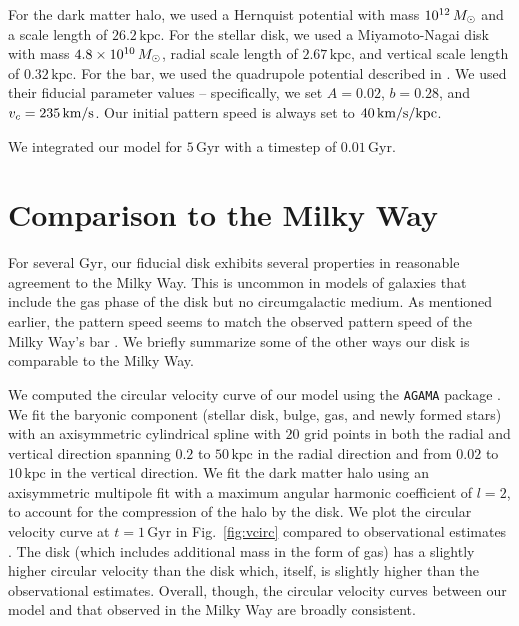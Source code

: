 \begin{appendices}
For the dark matter halo, we used a Hernquist potential
\citep{1990ApJ...356..359H} with mass $10^{12}\,M_{\odot}$ and a scale length of
$26.2\,\textrm{kpc}$. For the stellar disk, we used a Miyamoto-Nagai disk
\citep{1975PASJ...27..533M} with mass $4.8\times10^{10}\,M_{\odot}$, radial scale
length of $2.67\,\textrm{kpc}$, and vertical scale length of
$0.32\,\textrm{kpc}$. For the bar, we used the quadrupole potential described in
\citet{2022MNRAS.513..768C}. We used their fiducial parameter values --
specifically, we set $A=0.02$, $b=0.28$, and $v_c = 235\,\textrm{km}/\textrm{s}$. Our initial
pattern speed is always set to $40\,\textrm{km}/\textrm{s}/\textrm{kpc}$.

We integrated our model for $5\,\textrm{Gyr}$ with a timestep of
$0.01\,\textrm{Gyr}$.

\section{Comparison to the Milky Way}
\label{ch2:app:milkyway}
For several Gyr, our fiducial disk exhibits several properties in reasonable
agreement to the Milky Way. This is uncommon in models of galaxies that include
the gas phase of the disk but no circumgalactic medium. As mentioned earlier,
the pattern speed seems to match the observed pattern speed of the Milky Way's
bar \citep{2019MNRAS.490.4740B}. We briefly summarize some of the other ways our
disk is comparable to the Milky Way.

We computed the circular velocity curve of our model using the \texttt{AGAMA}
package \citep{2019MNRAS.482.1525V}. We fit the baryonic component (stellar
disk, bulge, gas, and newly formed stars) with an axisymmetric cylindrical
spline with $20$ grid points in both the radial and vertical direction spanning
$0.2$ to $50\,\textrm{kpc}$ in the radial direction and from $0.02$ to
$10\,\textrm{kpc}$ in the vertical direction. We fit the dark matter halo using
an axisymmetric multipole fit with a maximum angular harmonic coefficient
of $l=2$, to account for the compression of the halo by the disk. We plot
the circular velocity curve at $t=1\,\textrm{Gyr}$ in Fig.~\ref{fig:vcirc}
compared to observational estimates \citep{2019ApJ...871..120E}. The \SMUGGLE{}
disk (which includes additional mass in the form of gas) has a slightly higher
circular velocity than the \Nbody{} disk which, itself, is slightly higher than
the observational estimates. Overall, though, the circular velocity curves
between our model and that observed in the Milky Way are broadly consistent.


\end{appendices}

